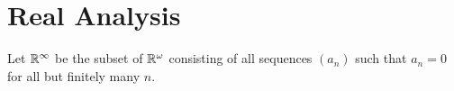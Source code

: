 \section{Real Analysis}

\begin{definition}
    Let $\mathbb{R}^\infty$ be the subset of $\mathbb{R}^\omega$ consisting of all sequences $(a_n)$ such that $a_n = 0$ for all but finitely many $n$.
\end{definition}